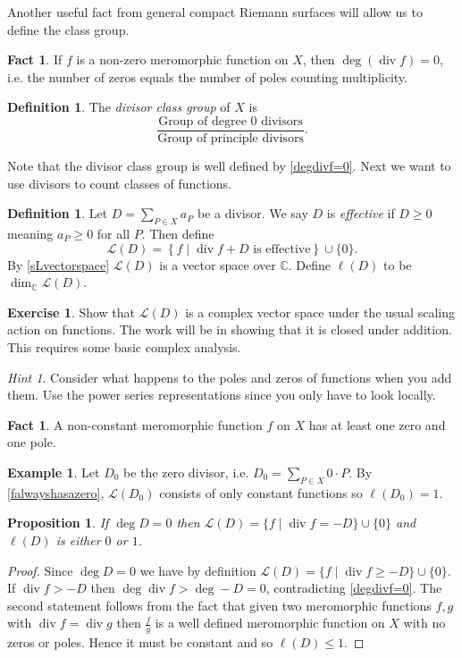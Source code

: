\documentclass[11pt]{article}
\newcommand{\BB}[1]{\mathbb{#1}} %
\newcommand{\script}[1]{\mathcal{#1}} %
\newcommand{\CC}{\BB{C}}
\newcommand{\sL}{\script{L}}
\newcommand{\st}{\mid}
\renewcommand{\div}{\operatorname{div}} %
\theoremstyle{plain}
\newtheorem{prop}[propositionCounter]{Proposition}
\theoremstyle{definition}
\newtheorem{defn}[definitionCounter]{Definition}
\newtheorem{ex}[exampleCounter]{Example}
\newtheorem{excer}[exerciseCounter]{Exercise}
\newtheorem{fact}[factCounter]{Fact}
\theoremstyle{remark}
\newtheorem*{hint}{Hint}
\begin{document}
Another useful fact from general compact Riemann surfaces will allow us to define the class group.

\begin{fact}\label{degdivf=0}
	If $f$ is a non-zero meromorphic function on $X$, then $\deg(\div f) = 0$, i.e. the number of zeros equals the number of poles counting multiplicity.
\end{fact}

\begin{defn}\label{classgp}
	The \emph{divisor class group} of $X$ is
	$$
	\frac{\text{Group of degree $0$ divisors}}{\text{Group of principle divisors}}.
	$$
\end{defn}

Note that the divisor class group is well defined by \autoref{degdivf=0}. Next we want to use divisors to count classes of functions.

\begin{defn}
	Let $D = \sum_{P\in X}a_P$ be a divisor. We say $D$ is \emph{effective} if $D \geq 0$ meaning $a_P\geq 0$ for all $P$. Then define
	$$
	\sL(D) = \left\{ f \st \div f + D \text{ is effective} \right\}\cup\{0\}.
	$$
	By \autoref{sLvectorspace} $\sL(D)$ is a vector space over $\CC$. Define $\ell(D)$ to be $\dim_{\CC}\sL(D)$.
\end{defn}

\begin{excer}\label{sLvectorspace}
	Show that $\sL(D)$ is a complex vector space under the usual scaling action on functions. The work will be in showing that it is closed under addition. This requires some basic complex analysis.
	\begin{hint}
		Consider what happens to the poles and zeros of functions when you add them. Use the power series representations since you only have to look locally.
	\end{hint}
\end{excer}

\begin{fact}\label{falwayshasazero}
	A non-constant meromorphic function $f$ on $X$ has at least one zero and one pole.
\end{fact}

\begin{ex}\label{key}
	Let $D_0$ be the zero divisor, i.e. $D_0 = \sum_{P\in X}0\cdot P$. By \autoref{falwayshasazero}, $\sL(D_0)$ consists of only constant functions so $\ell(D_0) = 1$.
\end{ex}

\begin{prop}
	If $\deg D = 0$ then $\sL(D) = \{f \st \div f = -D\}\cup\{0\}$ and $\ell(D)$ is either $0$ or $1$.
\end{prop}
\begin{proof}
	Since $\deg D = 0$ we have by definition $\sL(D) = \{f \st \div f \geq -D\}\cup\{0\}$. If $\div f > -D$ then $\deg \div f > \deg - D = 0$, contradicting \autoref{degdivf=0}. The second statement follows from the fact that given two meromorphic functions $f,g$ with $\div f = \div g$ then $\frac{f}{g}$ is a well defined meromorphic function on $X$ with no zeros or poles. Hence it must be constant and so $\ell(D) \leq 1$.
\end{proof}
\end{document}
